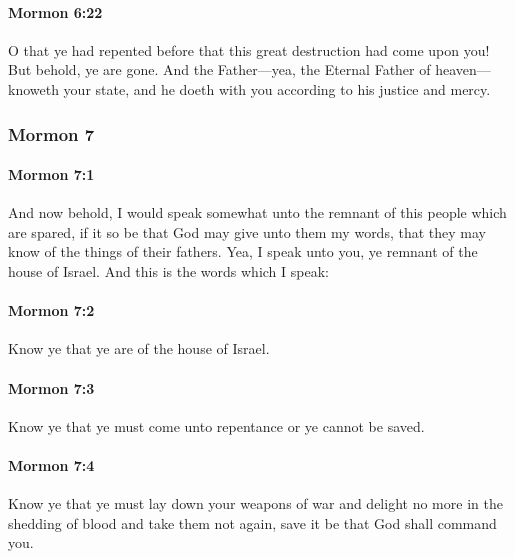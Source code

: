 		\paragraph{Mormon 6:22} %
			\label{MORMON-6-22}

			O that ye had repented
			before that this great destruction had come upon you!
			But behold, ye are gone.
			And the Father---yea, the Eternal Father of heaven---knoweth your state,
			and he doeth with you according to his justice and mercy.

	\subsubsection{Mormon 7} %
		\label{MORMON-7}
		
		\paragraph{Mormon 7:1} %
			\label{MORMON-7-1}

			And now behold, I would speak somewhat
			unto the remnant of this people which are spared,
			if it so be that God may give unto them my words,
			that they may know of the things of their fathers.
			Yea, I speak unto you, ye remnant of the house of Israel.
			And this is the words which I speak:

		\paragraph{Mormon 7:2} %
			\label{MORMON-7-2}

			Know ye that ye are of the house of Israel.

		\paragraph{Mormon 7:3} %
			\label{MORMON-7-3}

			Know ye that ye must come unto repentance or ye cannot be saved.

		\paragraph{Mormon 7:4} %
			\label{MORMON-7-4}

			Know ye that ye must lay down your weapons of war
			and delight no more in the shedding of blood
			and take them not again, save it be that God shall command you.

